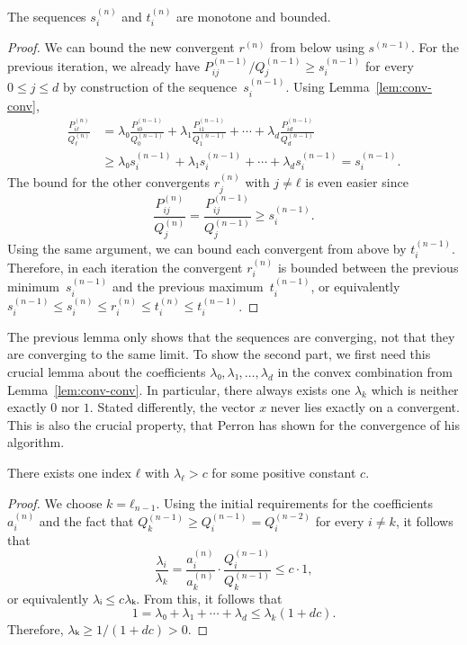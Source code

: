 \begin{lemma}
  The sequences $s_i^{(n)}$ and $t_i^{(n)}$ are monotone and bounded.
\end{lemma}

\begin{proof}
  We can bound the new convergent $r^{(n)}$ from below using $s^{(n-1)}$.
  For the previous iteration, we already have $P_{ij}^{(n-1)}/Q_j^{(n-1)} ≥ s_i^{(n-1)}$
  for every $0 ≤ j ≤ d$ by construction of the sequence~$s_i^{(n-1)}$.
  Using Lemma~\ref{lem:conv-conv},
  \begin{align*}
    \frac{P_{iℓ}^{(n)}}{Q_ℓ^{(n)}}
    & = λ₀ \frac{P_{i0}^{(n-1)}}{Q_0^{(n-1)}} + λ₁ \frac{P_{i1}^{(n-1)}}{Q_1^{(n-1)}} + ⋯ + λ_d \frac{P_{id}^{(n-1)}}{Q_d^{(n-1)}} \\
    & ≥ λ₀ s_i^{(n-1)} + λ₁ s_i^{(n-1)} + ⋯ + λ_d s_i^{(n-1)} = s_i^{(n-1)}.
  \end{align*}
  The bound for the other convergents $r_j^{(n)}$ with $j ≠ ℓ$ is even easier since
  \[
    \frac{P_{ij}^{(n)}}{Q_j^{(n)}} = \frac{P_{ij}^{(n-1)}}{Q_j^{(n-1)}} ≥ s_i^{(n-1)}.
  \]
  Using the same argument, we can bound each convergent from above by $t_i^{(n-1)}$.
  Therefore, in each iteration the convergent $r_i^{(n)}$ is
  bounded between the previous minimum~$s_i^{(n-1)}$ and the previous maximum~$t_i^{(n-1)}$,
  or equivalently $s_i^{(n-1)} ≤ s_i^{(n)} ≤ r_i^{(n)} ≤ t_i^{(n)} ≤ t_i^{(n-1)}$.
\end{proof}

The previous lemma only shows that the sequences are converging,
not that they are converging to the same limit.
To show the second part, we first need this crucial lemma
about the coefficients $λ₀, λ₁, …, λ_d$ in the convex combination from Lemma~\ref{lem:conv-conv}.
In particular, there always exists one $λ_k$ which is neither exactly $0$ nor $1$.
Stated differently, the vector $x$ never lies exactly on a convergent.
This is also the crucial property, that Perron has shown for the convergence of
his algorithm.

\begin{lemma}
  \label{lem:lambda-pos}
  There exists one index $ℓ$ with $λ_ℓ > c$ for some positive constant $c$.
\end{lemma}

\begin{proof}
  We choose $k = ℓ_{n-1}$.
  Using the initial requirements for the coefficients $a_i^{(n)}$ and the fact
  that $Q_k^{(n-1)} ≥ Q_i^{(n-1)} = Q_i^{(n-2)}$ for every $i ≠ k$,
  it follows that
  \[
    \frac{λ_i}{λ_k} = \frac{a_i^{(n)}}{a_k^{(n)}} · \frac{Q_i^{(n-1)}}{Q_k^{(n-1)}} ≤ c · 1,
  \]
  or equivalently $λᵢ ≤ c λₖ$. From this, it follows that
  \[
    1 = λ₀ + λ₁ + ⋯ + λ_d ≤ λ_k (1 + dc).
  \]
  Therefore, $λₖ ≥ 1/(1 + dc) > 0$.
\end{proof}

